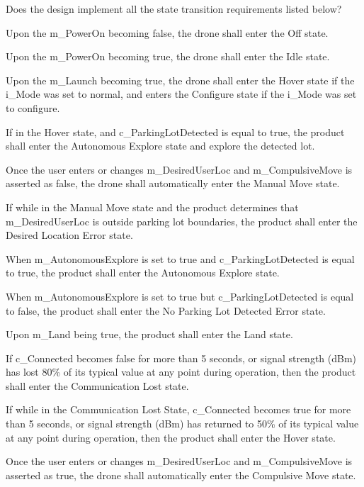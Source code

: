 \documentclass[12pt, titlepage]{article}
\begin{document}
\begin{todolist}
\begin{todolist}
\end{todolist}
\item Does the design implement all the state transition requirements listed below?
\begin{todolist}
    \item Upon the m\_PowerOn becoming false, the drone shall enter the Off state.
    \item Upon the m\_PowerOn becoming true, the drone shall enter the Idle state.
    \item Upon the m\_Launch becoming true, the drone shall enter the Hover state if the i\_Mode was set to normal, and enters the Configure state if the i\_Mode was set to configure.
    \item If in the Hover state, and c\_ParkingLotDetected is equal to true, the product shall enter the Autonomous Explore state and explore the detected lot.
    \item Once the user enters or changes m\_DesiredUserLoc and m\_CompulsiveMove is asserted as false, the drone shall automatically enter the Manual Move state.
    \item If while in the Manual Move state and the product determines that m\_DesiredUserLoc is outside parking lot boundaries, the product shall enter the Desired Location Error state.
    \item When m\_AutonomousExplore is set to true and c\_ParkingLotDetected is equal to true, the product shall enter the Autonomous Explore state.
    \item When m\_AutonomousExplore is set to true but c\_ParkingLotDetected is equal to false, the product shall enter the No Parking Lot Detected Error state.
    \item Upon m\_Land being true, the product shall enter the Land state.
    \item If c\_Connected becomes false for more than 5 seconds, or signal strength (dBm) has lost 80\% of its typical value at any point during operation, then the product shall enter the Communication Lost state.
    \item If while in the Communication Lost State, c\_Connected becomes true for more than 5 seconds, or signal strength (dBm) has returned to 50\% of its typical value at any point during operation, then the product shall enter the Hover state.
    \item Once the user enters or changes m\_DesiredUserLoc and m\_CompulsiveMove is asserted as true, the drone shall automatically enter the Compulsive Move state.
\end{todolist}
\end{todolist}
\end{document}
